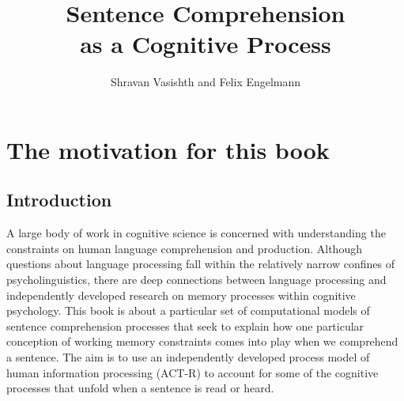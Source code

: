 \documentclass{cambridge7A}\usepackage[]{graphicx}\usepackage[]{color}
\begin{document}
  \title[A Computational Approach]
    {Sentence Comprehension \\ as a Cognitive Process}
  \author{Shravan Vasishth and Felix Engelmann}
 

\frontmatter
\maketitle
\tableofcontents
 

\listoffigures
\listoftables




\mainmatter


\chapter{The motivation for this book} \label{c00}

\section{Introduction}

A large body of work in cognitive science is concerned with
understanding the constraints on human language comprehension and
production. Although questions about language processing fall within the relatively narrow confines of psycholinguistics, there are deep connections between language processing and independently developed research on memory processes within cognitive psychology. This book
is about a particular set of computational models of sentence
comprehension processes
\citep{LewisVasishth2005,EngelmannJaegerVasishth2019} that seek to
explain how one particular conception of working memory constraints
comes into play when we comprehend a sentence. The aim is to use an
independently developed process model of human information processing  
(ACT-R) to account for some of the cognitive processes that unfold
when a sentence is read or heard.
\end{document}
